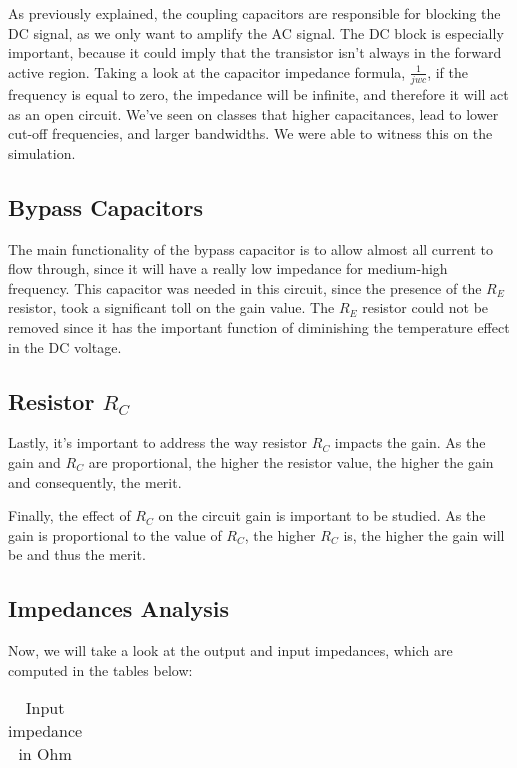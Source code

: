 As previously explained, the coupling capacitors are responsible for blocking the DC signal, as we only want to amplify the AC signal. The DC block is especially important, because it could imply that the transistor isn't always in the forward active region. Taking a look at the capacitor impedance formula, $\frac{1}{jwc}$, if the frequency is equal to zero, the impedance will be infinite, and therefore it will act as an open circuit. We've seen on classes that higher capacitances, lead to lower cut-off frequencies, and larger bandwidths. We were able to witness this on the simulation. 


\subsection{Bypass Capacitors}

\par 
The main functionality of the bypass capacitor is to allow almost all current to flow through, since it will have a really low impedance for medium-high frequency. This capacitor was needed in this circuit, since the presence of the $R_E$ resistor, took a significant toll on the gain value. The $R_E$ resistor could not be removed since it has the important function of diminishing the temperature effect in the DC voltage.
 

\subsection{Resistor $R_C$}

\par Lastly, it's important to address the way resistor $R_C$ impacts the gain. As the gain and $R_C$ are proportional, the higher the resistor value, the higher the gain and consequently, the merit.

Finally, the effect of $R_C$ on the circuit gain is important to be studied. As the gain is proportional to the value of $R_C$, the higher $R_C$ is, the higher the gain will be and thus the merit.   

\subsection{Impedances Analysis}

Now, we will take a look at the output and input impedances, which are computed in the tables below:


\begin{table}[H]
\centering
\begin{tabularx}{0.6\textwidth} {
  | >{\raggedright\arraybackslash}X
  | >{\raggedleft\arraybackslash}X | }
 \hline

\end{tabularx}
\caption{Input impedance in Ohm}
\end{table}

